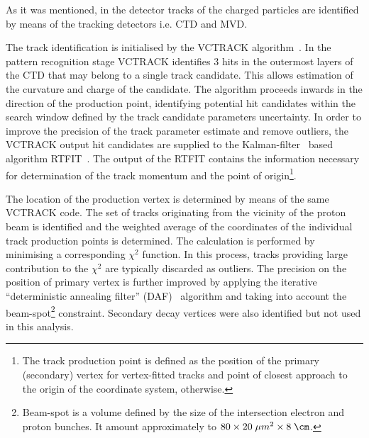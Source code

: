 As it was mentioned, in the \zeus detector tracks of the charged particles are identified by means of the tracking detectors i.e. CTD and MVD.

The track identification is initialised by the VCTRACK algorithm~\cite{upub:hartner:zn9858,upub:hartner:zn9764}. In the pattern recognition stage VCTRACK identifies 3 hits in the outermost layers of the CTD that may belong to a single track candidate. This allows estimation of the curvature and charge of the candidate. The algorithm proceeds inwards in the direction of the production point, identifying potential hit candidates within the search window defined by the track candidate parameters uncertainty. In order to improve the precision of the track parameter estimate and remove outliers, the VCTRACK output hit candidates are supplied to the Kalman-filter~\cite{Klaman:1960} based algorithm RTFIT~\cite{upub:spiridonov:rtfit}. The output of the RTFIT contains the information necessary for determination of the track momentum and the point of origin\footnote{The track production point is defined as the position of the primary (secondary) vertex for vertex-fitted tracks and point of closest approach to the origin of the coordinate system, otherwise.}.

The location of the production vertex is determined by means of the same VCTRACK code. The set of tracks originating from the vicinity of the proton beam is identified and the weighted average of the coordinates of the individual track production points is determined. The calculation is performed by minimising a corresponding $\chi^2$ function. In this process, tracks providing large contribution to the $\chi^2$ are typically discarded as outliers. The precision on the position of primary vertex is further improved by applying the iterative ``deterministic annealing filter'' (DAF)~\cite{Fruewirth:2010} algorithm and taking into account the beam-spot\footnote{Beam-spot is a volume defined by the size of the intersection electron and proton bunches. It amount approximately to $80 \times 20\; \mu m^{2} \times 8\; \cm$.} constraint. Secondary decay vertices were also identified but not used in this analysis.